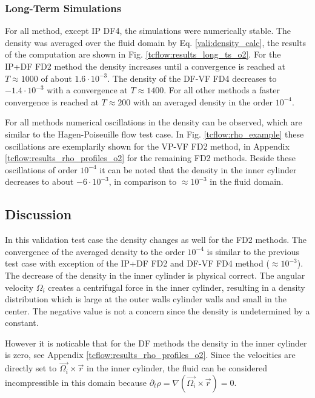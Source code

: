 \clearpage

\subsubsection{Long-Term Simulations}

For all method, except IP DF4,  the simulations were numerically stable.
The density was averaged over the fluid domain by Eq.  \ref{vali:density_calc},
the results of the computation are shown in Fig. \ref{tcflow:results_long_ts_o2}.
For the IP+DF FD2 method the density increases until a convergence is reached at $T\approx 1000$ of about $1.6\cdot10^{-3}$.
The density of the  DF-VF FD4 decreases to $-1.4\cdot10^{-3}$ with a convergence at $T\approx1400$.
For all other methods a faster convergence is reached at $T\approx200$ with an  averaged density in the order $10^{-4}$.

For all methods numerical oscillations in the density can be
observed, which  are similar to the Hagen-Poiseuille flow test case.
In Fig. \ref{tcflow:rho_example} these oscillations are exemplarily shown for the VP-VF FD2 method,
in Appendix \ref{tcflow:results_rho_profiles_o2} for the remaining FD2 methods.
Beside these oscillations of order $10^{-4}$ it can be noted that the density in the inner cylinder
decreases to about $-6\cdot10^{-3}$, in comparison to $\approx10^{-3}$ in the fluid domain.

\subsection{Discussion}

In this validation test case the density  changes as well for the FD2 methods.
The convergence of the averaged density to the order $10^{-4}$
is similar to the previous test case with exception of the IP+DF FD2 and DF-VF FD4 method ($\approx10^{-3}$).
The decrease of the density in the inner cylinder is physical correct.
The angular velocity $\Omega_i$ creates a centrifugal force in the inner cylinder,
resulting in a density distribution which is large at the outer walls cylinder walls and small in the center.
The negative value is not a concern since the density is undetermined by a constant.

However it is noticable that for the DF methods the density in the inner cylinder is zero, see Appendix \ref{tcflow:results_rho_profiles_o2}.
Since the velocities are directly set to $\vec{\Omega_i} \times \vec{r}$ in the inner cylinder,
the fluid can be considered incompressible in this domain because $\partial_t \rho = \nabla (\vec{\Omega_i} \times \vec{r}) = 0$.

